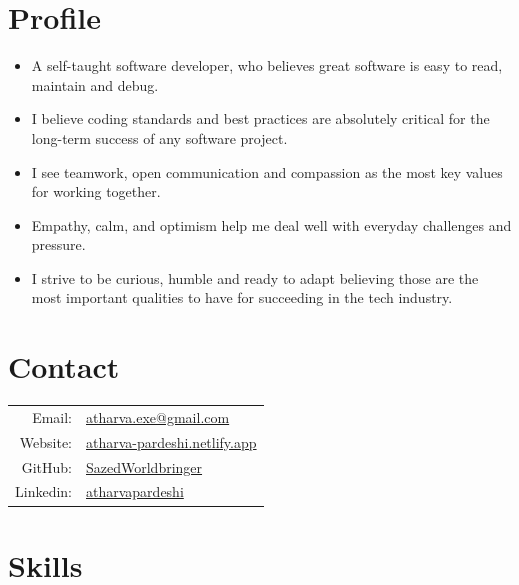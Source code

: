\documentclass[11pt, oneside, a4paper, titlepage]{article}
\begin{document}
\begin{tcolorbox}
  \begin{minipage}[t]{8cm}
    \vspace*{-0.5cm}
    \begin{tcolorbox}[grow to left by=0.6cm,colback=gray!25,colframe=white]

      \section*{Profile}
      \begin{itemize}
        \item{
      A self-taught software developer,
      who believes great software is easy to read,
      maintain and debug.
          }
        \item{
      I believe coding standards and best practices are absolutely critical
      for the long-term success of any software project.
          }
        \item{
      I see teamwork, open communication and compassion
      as the most key values for working together.
          }
        \item{
      Empathy, calm, and optimism
      help me deal well with everyday challenges and pressure.
        }
      \item{
      I strive to be curious, humble and ready to adapt
      believing those are the most important qualities to have
      for succeeding in the tech industry.
        }
      \end{itemize}

      \section*{Contact}
      \begin{tabular}{r l}
        Email: & \href{mailto:atharva.exe@gmail.com}{atharva.exe@gmail.com} \\
        Website: & \href{https://atharva-pardeshi.netlify.app}{atharva-pardeshi.netlify.app} \\
        GitHub: & \href{https://github.com/SazedWorldbringer}{SazedWorldbringer} \\
        Linkedin: & \href{https://linkedin.com/in/atharvapardeshi}{atharvapardeshi} \\
      \end{tabular}

      \section*{Skills}

\end{tcolorbox}
\end{minipage}
\end{tcolorbox}
\end{document}
